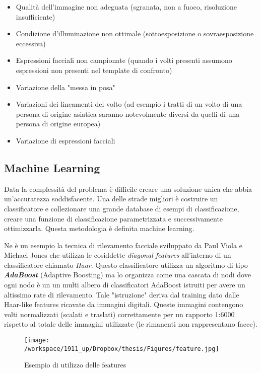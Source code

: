\begin{itemize}
\item Qualità dell'immagine non adeguata (sgranata, non a fuoco, risoluzione insufficiente)
\item Condizione d'illuminazione non ottimale (sottoesposizione o sovraesposizione eccessiva)
\item Espressioni facciali non campionate (quando i volti presenti assumono espressioni non presenti nel template di confronto)
\item Variazione della "messa in posa"
\item Variazioni dei lineamenti del volto (ad esempio i tratti di un volto di una persona di origine asiatica saranno notevolmente diversi da quelli di una persona di origine europea)
\item Variazione di espressioni facciali
\end{itemize}

\subsection{Machine Learning}

Data la complessità del problema è difficile creare una soluzione unica che abbia un'accuratezza soddisfacente. Una delle strade migliori è costruire un classificatore e collezionare una grande database di esempi di classificazione, creare una funzione di classificazione parametrizzata e successivamente ottimizzarla. Questa metodologia è definita machine learning. 

Ne è un esempio la tecnica di rilevamento facciale sviluppato da Paul Viola e Michael Jones che utilizza le cosiddette \textit{diagonal features} all'interno di un classificatore chiamato \textit{Haar}. Questo classificatore utilizza un algoritmo di tipo \textbf{\textit{AdaBoost}} (Adaptive Boosting) ma lo organizza come una cascata di nodi dove ogni nodo è un un multi albero di classificatori AdaBoost istruiti per avere un altissimo rate di rilevamento. Tale "istruzione" deriva dal training dato dalle Haar-like features ricavate da immagini digitali. Queste immagini contengono volti normalizzati (scalati e traslati) correttamente per un rapporto 1:6000 rispetto al totale delle immagini utilizzate (le rimanenti non rappresentano facce).


\begin{figure}[H]\centering  
\texttt{[image: /workspace/1911\_up/Dropbox/thesis/Figures/feature.jpg]}
\caption[Esempio di utilizzo delle features]{Esempio di utilizzo delle features}
\label{pic-a}
\end{figure}

